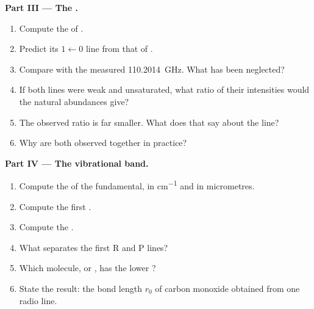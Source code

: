 \begin{problem}
\medskip\noindent\textbf{Part III --- The .}
\begin{enumerate}[resume]
  \item Compute the  of .
  \item Predict its $1 \leftarrow 0$ line from that of .
  \item Compare with the measured \qty{110.2014}{GHz}. What has been neglected?
  \item If both lines were weak and unsaturated, what ratio of their
        intensities would the natural abundances give?
  \item The observed ratio is far smaller. What does that say about the
         line?
  \item Why are both  observed together in practice?
\end{enumerate}

\medskip\noindent\textbf{Part IV --- The vibrational band.}
\begin{enumerate}[resume]
  \item Compute the  of the fundamental, in \unit{cm^{-1}} and in
        micrometres.
  \item Compute the first .
  \item Compute the .
  \item What separates the first R and P lines?
  \item Which molecule,  or , has the lower ?
  \item State the result: the bond length $r_0$ of carbon monoxide obtained
        from one radio line.
\end{enumerate}
\end{problem}
